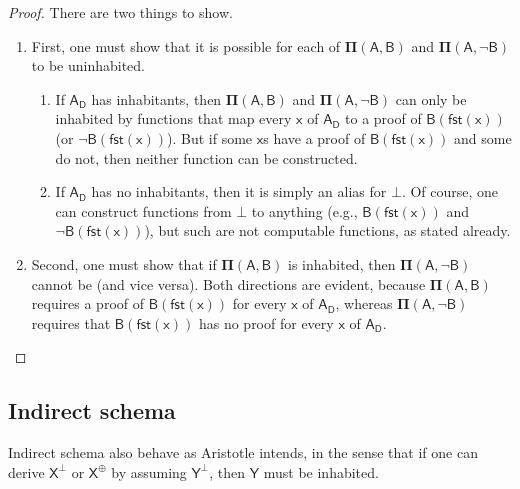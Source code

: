 \documentclass{article}
\newcommand\e{\mathsf}
\def\Empty/{\e{\bot}}
\def\x/{\e{x}}
\def\Y/{\e{Y}}
\def\Domain/{\e{D}}
\newcommand\Contradictory[1]{\e{#1^{\Empty/}}}
\newcommand\Contrary[1]{\e{#1^{\oplus}}}
\newcommand\Dep[2]{\e{#1(#2)}}
\newcommand\First[1]{\e{fst(#1)}}
\newcommand\Gen[2]{\e{#1_{#2}}}
\newcommand\PI[2]{\mathbf{\Pi}\e{(#1, #2)}}
\begin{document}
\begin{proof}
  There are two things to show. 
  
  \begin{enumerate} 
  
    \item First, one must show that it is possible for each of $\PI{A}{B}$ and $\PI{A}{\lnot B}$ to be uninhabited. 
  
    \begin{enumerate}
  
      \item If $\Gen{A}{\Domain/}$ has inhabitants, then $\PI{A}{B}$ and $\PI{A}{\lnot B}$ can only be inhabited by functions that map every $\x/$ of $\Gen{A}{\Domain/}$ to a proof of $\Dep{B}{\First{x}}$ (or $\lnot \Dep{B}{\First{x}}$). But if some $\x/$s have a proof of $\Dep{B}{\First{x}}$ and some do not, then neither function can be constructed. 
    
      \item If $\Gen{A}{\Domain/}$ has no inhabitants, then it is simply an alias for $\Empty/$. Of course, one can construct functions from $\Empty/$ to anything (e.g., $\Dep{B}{\First{x}}$ and $\lnot \Dep{B}{\First{x}}$), but such are not computable functions, as stated already.
  
    \end{enumerate}
  
  \item Second, one must show that if $\PI{A}{B}$ is inhabited, then $\PI{A}{\lnot B}$ cannot be (and vice versa). Both directions are evident, because $\PI{A}{B}$ requires a proof of $\Dep{B}{\First{x}}$ for every $\x/$ of $\Gen{A}{\Domain/}$, whereas $\PI{A}{\lnot B}$ requires that $\Dep{B}{\First{x}}$ has no proof for every $\x/$ of $\Gen{A}{\Domain/}$.
  
  \end{enumerate}
\end{proof}



\subsection{Indirect schema}

Indirect schema also behave as Aristotle intends, in the sense that if one can derive $\Contradictory{X}$ or $\Contrary{X}$ by assuming $\Contradictory{Y}$, then $\Y/$ must be inhabited.
\end{document}
